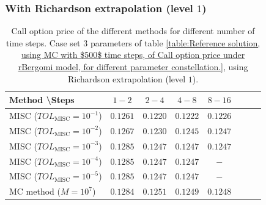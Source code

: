 \FloatBarrier
\subsubsection*{With Richardson extrapolation (level $1$)}
\begin{table}[h!]
	\centering
	\begin{tabular}{l*{6}{c}r}
		Method \textbackslash  Steps    &$1-2$         & $2-4$ & $4-8$ & $8-16$\\
		\hline
		MISC ($TOL_{\text{MISC}}=10^{-1}$)   &$ 0.1261$ & $0.1220$  &$0.1222$ & $0.1226$\\
		MISC ($TOL_{\text{MISC}}=10^{-2}$)   &$ 0.1267$ & $0.1230$ & $0.1245$ & $0.1247$  \\	
		MISC ($TOL_{\text{MISC}}=10^{-3}$)   &$0.1285$ & $0.1247$ & $0.1247$ &  $0.1247$ \\
		MISC ($TOL_{\text{MISC}}=10^{-4}$)  &$0.1285$ & $0.1247$ & $0.1247$ & $-$ \\
			MISC ($TOL_{\text{MISC}}=10^{-5}$)  &$0.1285$ & $0.1247$ &  $0.1247$ & $-$ \\
	
		\hline
		MC method ($M=10^{7}$)   & $     0.1284$  & $ 
		0.1251$  & $0.1249$ & $  0.1248$ \\		
		\hline
	\end{tabular}
	\caption{Call option price of the different methods for different number of time steps. Case set $3$ parameters of table \ref{table:Reference solution, using MC with $500$ time steps, of Call option price under rBergomi model, for different parameter constellation.}, using Richardson extrapolation (level $1$).}
	\label{table:  Call option price of the different methods for different number of time steps. Case set $5$ parameter, using Richardson extrapolation (level $3$)}
\end{table}



